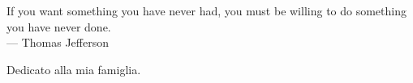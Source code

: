 
\cleardoublepage
{}
\thispagestyle{empty}

\vspace*{3cm}

\begin{center}
If you want something you have never had, you must be willing to do something you have never done. \\ \medskip
--- Thomas Jefferson    
\end{center}

\medskip

\begin{center}
Dedicato alla mia famiglia.
\end{center}
